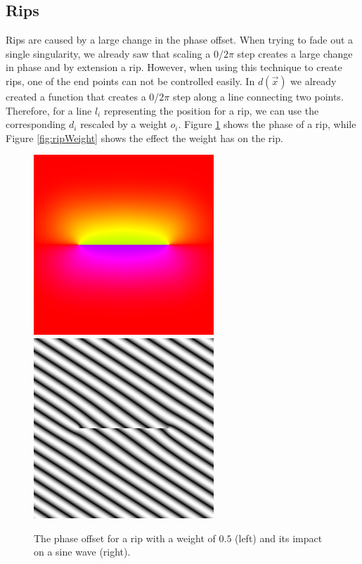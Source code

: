 \documentclass{utue} %
\begin{document}
\subsection{Rips}\label{sec:rips}
Rips are caused by a large change in the phase offset. When trying to fade out a single singularity, we already saw that scaling a $0$/$2\pi$ step creates a large change in phase and by extension a rip. However, when using this technique to create rips, one of the end points can not be controlled easily. In $d(\vec{x})$ we already created a function that creates a $0$/$2\pi$ step along a line connecting two points. Therefore, for a line $l_i$ representing the position for a rip, we can use the corresponding $d_i$ rescaled by a weight $o_i$. Figure \ref{fig:ripPhase} shows the phase of a rip, while Figure \ref{fig:ripWeight} shows the effect the weight has on the rip.

\begin{figure}[ht]
  \centering
  \includegraphics[width=0.49\linewidth]{images/ripPhase}
  \includegraphics[width=0.49\linewidth]{images/rip05}
  \caption{The phase offset for a rip with a weight of $0.5$ (left) and its impact on a sine wave (right).}\label{fig:ripPhase}
\end{figure}
\end{document}
